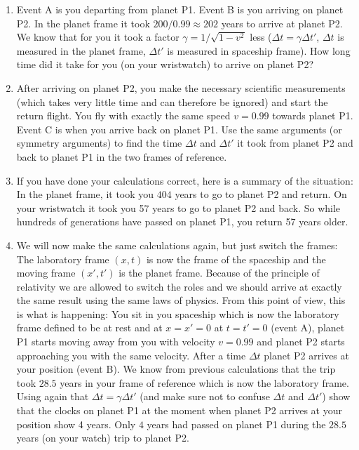 {\begin{multicols}{2}
\begin{enumerate}
\item Event A is you departing from planet P1. Event B is you arriving on planet P2. In the planet frame it took $200/0.99\approx202$ years to arrive at planet P2. We know that for you it took a factor $\gamma=1/\sqrt{1-v^2}$ less ($\Delta t=\gamma\Delta t'$, $\Delta t$ is measured in the planet frame, $\Delta t'$ is measured in spaceship frame). How long time did it take for you (on your wristwatch) to arrive on planet P2?
\item After arriving on planet P2, you make the necessary scientific measurements (which takes very little time and can therefore be ignored) and start the return flight. You fly with exactly the same speed $v=0.99$ towards planet P1. Event C is when you arrive back on planet P1. Use the same arguments (or symmetry arguments) to find the time $\Delta t$ and $\Delta t'$ it took from planet P2 and back to planet P1 in the two frames of reference.
\item If you have done your calculations correct, here is a summary of the situation: In the planet frame, it took you $404$ years to go to planet P2 and return. On your wristwatch it took you 57 years to go to planet P2 and back. So while hundreds of generations have passed on planet P1, you return 57 years older.
\item We will now make the same calculations again, but just switch the frames: The laboratory frame $(x,t)$ is now the frame of the spaceship and the moving frame $(x',t')$ is the planet frame. Because of the principle of relativity we are allowed to switch the roles and we should arrive at exactly the same result using the same laws of physics. From this point of view, this is what is happening: You sit in you spaceship which is now the laboratory frame defined to be at rest and at $x=x'=0$ at $t=t'=0$ (event A), planet P1 starts moving away from you with velocity $v=0.99$ and planet P2 starts approaching you with the same velocity. After a time $\Delta t$ planet P2 arrives at your position (event B). We know from previous calculations that the trip took $28.5$ years in your frame of reference which is now the laboratory frame. Using again that $\Delta t=\gamma \Delta t'$ (and make sure not to confuse $\Delta t$ and $\Delta t'$) show that the clocks on planet P1 at the moment when planet P2 arrives at your position show 4 years. Only $4$ years had passed on planet P1 during the $28.5$ years (on your watch) trip to planet P2.

\end{enumerate}
\end{multicols}}
